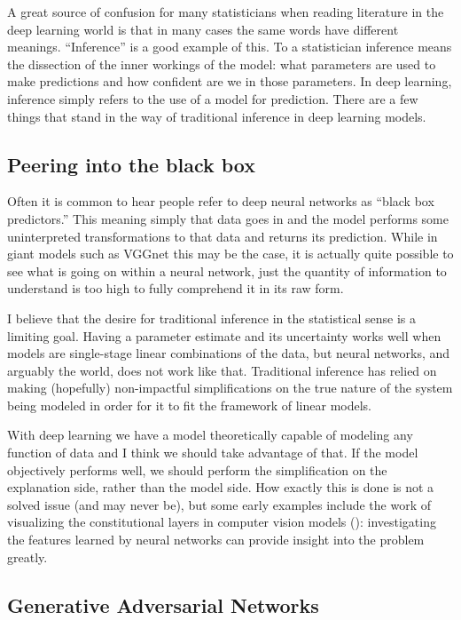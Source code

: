 \documentclass[]{book}
\theoremstyle{definition}
\theoremstyle{definition}
\theoremstyle{definition}
\theoremstyle{remark}
\begin{document}
A great source of confusion for many statisticians when reading
literature in the deep learning world is that in many cases the same
words have different meanings. ``Inference'' is a good example of this.
To a statistician inference means the dissection of the inner workings
of the model: what parameters are used to make predictions and how
confident are we in those parameters. In deep learning, inference simply
refers to the use of a model for prediction. There are a few things that
stand in the way of traditional inference in deep learning models.

\subsection{Peering into the black
box}\label{peering-into-the-black-box}

Often it is common to hear people refer to deep neural networks as
``black box predictors.'' This meaning simply that data goes in and the
model performs some uninterpreted transformations to that data and
returns its prediction. While in giant models such as VGGnet this may be
the case, it is actually quite possible to see what is going on within a
neural network, just the quantity of information to understand is too
high to fully comprehend it in its raw form.

I believe that the desire for traditional inference in the statistical
sense is a limiting goal. Having a parameter estimate and its
uncertainty works well when models are single-stage linear combinations
of the data, but neural networks, and arguably the world, does not work
like that. Traditional inference has relied on making (hopefully)
non-impactful simplifications on the true nature of the system being
modeled in order for it to fit the framework of linear models.

With deep learning we have a model theoretically capable of modeling any
function of data and I think we should take advantage of that. If the
model objectively performs well, we should perform the simplification on
the explanation side, rather than the model side. How exactly this is
done is not a solved issue (and may never be), but some early examples
include the work of visualizing the constitutional layers in computer
vision models (\citet{cnn_vis}): investigating the features learned by
neural networks can provide insight into the problem greatly.

\subsection{Generative Adversarial
Networks}\label{generative-adversarial-networks}
\end{document}
